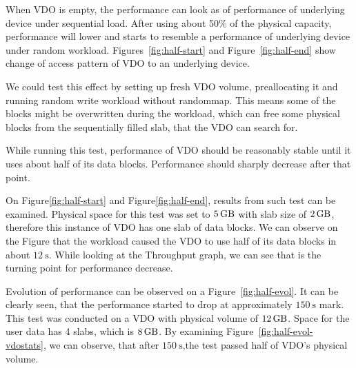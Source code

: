 \documentclass[
  color, %
  table, %
  lof,   %
  lot,   %
]{fithesis3}
\begin{document}
When VDO is empty, the performance can look as of performance of underlying device under sequential load. After using about 50\% of the physical capacity, performance will lower and starts to resemble a performance of underlying device under random workload. Figures~\ref{fig:half-start} and Figure~\ref{fig:half-end} show change of access pattern of VDO to an underlying device.

We could test this effect by setting up fresh VDO volume, preallocating it and running random write workload without randommap. This means some of the blocks might be overwritten during the workload, which can free some physical blocks from the sequentially filled slab, that the VDO can search for.

While running this test, performance of VDO should be reasonably stable until it uses about half of its data blocks. Performance should sharply decrease after that point.

On Figure\ref{fig:half-start} and Figure\ref{fig:half-end}, results from such test can be examined. Physical space for this test was set to $\SI{5}{\giga\byte}$ with slab size of $\SI{2}{\giga\byte}$, therefore this instance of VDO has one slab of data blocks. We can observe on the Figure that the workload caused the VDO to use half of its data blocks in about $\SI{12}{\second}$. While looking at the Throughput graph, we can see that is the turning point for performance decrease.\footnotemark[1]

Evolution of performance can be observed on a Figure~\ref{fig:half-evol}. It can be clearly seen, that the performance started to drop at approximately $\SI{150}{\second}$ mark. This test was conducted on a VDO with physical volume of $\SI{12}{\giga\byte}$. Space for the user data has 4 slabs, which is $\SI{8}{\giga\byte}$. By examining Figure~\ref{fig:half-evol-vdostats}, we can observe, that after $\SI{150}{\second}$,the test passed half of VDO's physical volume.
\end{document}
